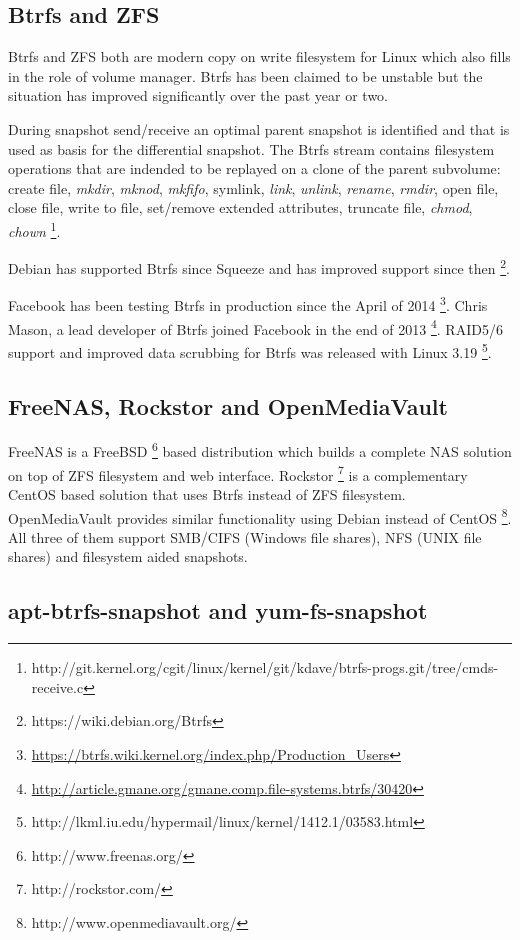 \documentclass{article}
\begin{document}
\subsection{Btrfs and ZFS}

Btrfs and ZFS both are modern copy on write filesystem for Linux which also
fills in the role of volume manager. Btrfs has been claimed to be unstable but
the situation has improved significantly over the past year or two. 

During snapshot send/receive an optimal parent snapshot is identified and that
is used as basis for the differential snapshot. The Btrfs stream contains
filesystem operations that are indended to be replayed on a clone of the
parent subvolume: create file, \emph{mkdir}, \emph{mknod}, \emph{mkfifo},
symlink, \emph{link}, \emph{unlink}, \emph{rename}, \emph{rmdir}, open file,
close file, write to file, set/remove extended attributes, truncate file,
\emph{chmod}, \emph{chown}
\footnote{http://git.kernel.org/cgit/linux/kernel/git/kdave/btrfs-progs.git/tree/cmds-receive.c}.

Debian has supported Btrfs since Squeeze and has improved support since then
\footnote{https://wiki.debian.org/Btrfs}.  

Facebook has been testing Btrfs in production since the April of 2014
\footnote{\url{https://btrfs.wiki.kernel.org/index.php/Production_Users}}.
Chris Mason, a lead developer of Btrfs joined Facebook in the end of 2013
\footnote{\url{http://article.gmane.org/gmane.comp.file-systems.btrfs/30420}}.
RAID5/6 support and improved data scrubbing for Btrfs was released with Linux
3.19 \footnote{http://lkml.iu.edu/hypermail/linux/kernel/1412.1/03583.html}.


\subsection{FreeNAS, Rockstor and OpenMediaVault}

FreeNAS is a FreeBSD \footnote{http://www.freenas.org/}
based distribution which builds a complete NAS solution on top of
ZFS filesystem and web interface.
Rockstor \footnote{http://rockstor.com/}
is a complementary CentOS based solution that uses Btrfs instead
of ZFS filesystem.
OpenMediaVault provides similar functionality using Debian instead of CentOS
\footnote{http://www.openmediavault.org/}.
All three of them support SMB/CIFS (Windows file shares),
NFS (UNIX file shares) and filesystem aided snapshots.


\subsection{apt-btrfs-snapshot and yum-fs-snapshot}
\end{document}
